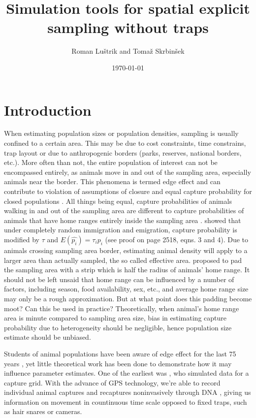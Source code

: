 \documentclass[a4paper]{article}
\title{Simulation tools for spatial explicit sampling without traps}
\author{Roman Luštrik and Tomaž Skrbinšek}
\date{\today}
\begin{document}
\maketitle
\tableofcontents

\section{Introduction}

When estimating population sizes or population densities, sampling is usually confined to a certain area. This may be due to cost constraints, time constrains, trap layout or due to anthropogenic borders (parks, reserves, national borders, etc.). More often than not, the entire population of interest can not be encompassed entirely, as animals move in and out of the sampling area, especially animals near the border. This phenomena is termed edge effect and can contribute to violation of assumptions of closure and equal capture probability for closed populations \citep{williams2002}. All things being equal, capture probabilities of animals walking in and out of the sampling area are different to capture probabilities of animals that have home ranges entirely inside the sampling area \citep{burnham-n-overton1978}. \citet{kendall1999} showed that under completely random immigration and emigration, capture probability is modified by $\tau$ and $E(\hat{p_i}) = \tau_i p_i$ (see proof on page 2518, eqns. 3 and 4). Due to animals crossing sampling area border, estimating animal density will apply to a larger area than actually sampled, the so called effective area. \citet{dice1938, dice1941} proposed to pad the sampling area with a strip which is half the radius of animals' home range. It should not be left unsaid that home range can be influenced by a number of factors, including season, food availability, sex, etc., and average home range size may only be a rough approximation. But at what point does this padding become moot? Can this be used in practice? Theoretically, when animal's home range area is minute compared to sampling area size, bias in estimating capture probability due to heterogeneity should be negligible, hence population size estimate should be unbiased.

Students of animal populations have been aware of edge effect for the last 75 years \citep{efford2004}, yet little theoretical work has been done to demonstrate how it may influence parameter estimates. One of the earliest was \citet{schroder1981}, who simulated data for a capture grid. With the advance of GPS technology, we're able to record individual animal captures and recaptures noninvasively through DNA \citep{waits2005}, giving us information on movement in countinuous time scale opposed to fixed traps, such as hair snares or cameras. 
   
\end{document}

